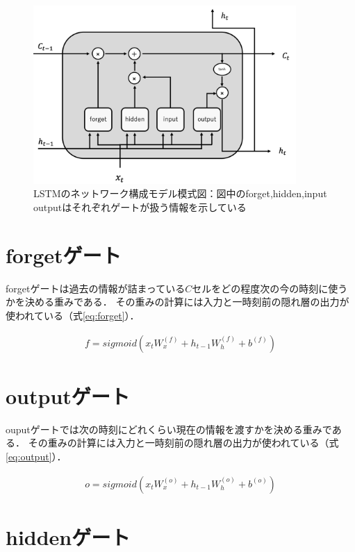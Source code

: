 \documentclass[a4j,11pt,report]{jsbook}
\begin{document}
\begin{figure}
  \centering
  \includegraphics[width = 100mm]{image/lstm_simple_image.png}
  \caption{LSTMのネットワーク構成モデル模式図：図中のforget,hidden,input outputはそれぞれゲートが扱う情報を示している }
  \label{fig:LSTM_Simple}
\end{figure}

\section{forgetゲート\label{sec:forget}}
forgetゲートは過去の情報が詰まっている$C$セルをどの程度次の今の時刻に使うかを決める重みである．
その重みの計算には入力と一時刻前の隠れ層の出力が使われている（式\ref{eq:forget}）．

\begin{equation}
  \label{eq:forget}
  \begin{split}
    f = sigmoid(x_{t}W_{x}^{(f)} + h_{t-1}W_{h}^{(f)} + b^{(f)})
  \end{split}
\end{equation}



\section{outputゲート\label{sec:output}}
ouputゲートでは次の時刻にどれくらい現在の情報を渡すかを決める重みである．
その重みの計算には入力と一時刻前の隠れ層の出力が使われている（式\ref{eq:output}）．


\begin{equation}
  \label{eq:output}
  \begin{split}
    o = sigmoid(x_{t}W_{x}^{(o)} + h_{t-1}W_{h}^{(o)} + b^{(o)})
  \end{split}
\end{equation}

\section{hiddenゲート\label{sec:hidden}}
\end{document}
